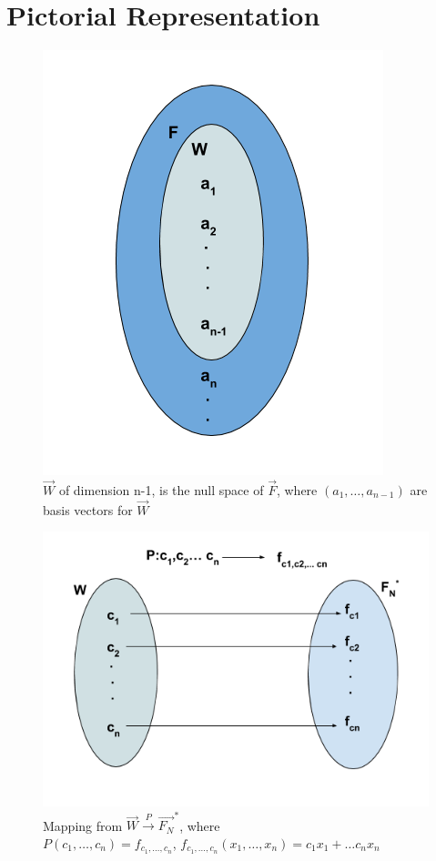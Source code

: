 \documentclass[journal,12pt,twocolumn]{IEEEtran}
\begin{document}
\section{Pictorial Representation}
\begin{figure}[h!]
\centering
\includegraphics[scale = 0.5]{W_Nullspace.png}
\caption{$\vec{W}$ of dimension n-1, is the null space of $\vec{F}$, where $(a_1,\hdots, a_{n-1})$ are basis vectors for $\vec{W}$}
\end{figure}
\pagebreak
\begin{figure}[h!]
\centering
\includegraphics[scale=0.5]{WtoFn.png}
\caption{Mapping from $\vec{W} \xrightarrow{P} \vec{F_N}^*$, where \\ $P(c_1,\hdots,c_n) = f_{c_1,\hdots,c_n}$, $f_{c_1,\hdots,c_n}(x_1, \hdots , x_n) = c_1x_1 + \hdots c_nx_n$} 
\end{figure}
\end{document}

